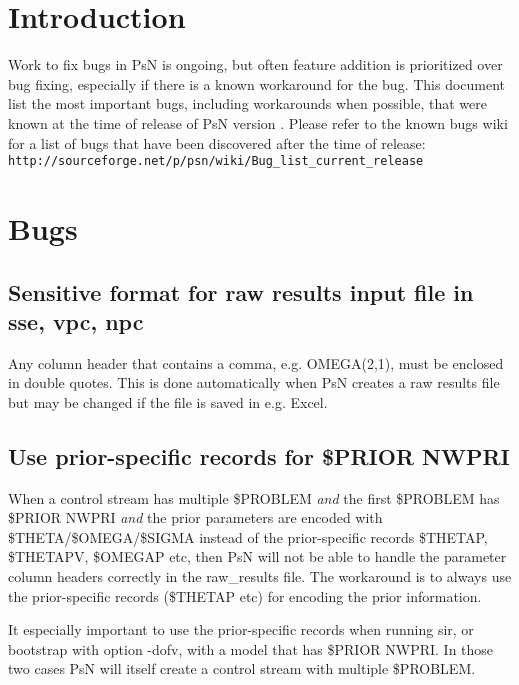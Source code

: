 




\maketitle

\section{Introduction}
Work to fix bugs in PsN is ongoing, but often feature addition is prioritized over bug fixing, 
especially if there is a known workaround for the bug. This document list the most important bugs, including workarounds when possible,
that were known at the time of release of PsN version \psnversion. Please refer to the known bugs wiki
for a list of bugs that have been discovered after the time of release:\\
\texttt{http://sourceforge.net/p/psn/wiki/Bug\_list\_current\_release}   

\section{Bugs}

\subsection{Sensitive format for raw results input file in sse, vpc, npc}
Any column header that contains a comma, e.g. OMEGA(2,1), must be enclosed in double quotes. This is done automatically when PsN creates a raw results file but may be changed if the file is saved in e.g. Excel.

\subsection{Use prior-specific records for \$PRIOR NWPRI}
When a control stream has multiple \$PROBLEM \emph{and} the first \$PROBLEM has \$PRIOR NWPRI
\emph{and} the prior parameters are encoded with \$THETA/\$OMEGA/\$SIGMA instead of the
prior-specific records \$THETAP, \$THETAPV, \$OMEGAP etc, then PsN will not be able to handle the parameter column
headers correctly in the raw\_results file. The workaround is to always use the prior-specific records 
(\$THETAP etc) for encoding the prior information.

It especially important to use the prior-specific records when running sir,  
or bootstrap with option -dofv,
with a model that has \$PRIOR NWPRI. In
those two cases PsN will itself create a control stream with multiple \$PROBLEM.

